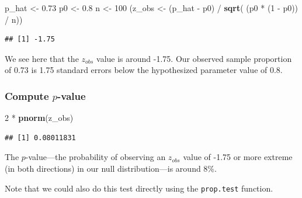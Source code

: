\documentclass[]{tufte-book}
\newenvironment{Shaded}{\begin{snugshade}}{\end{snugshade}}
\newcommand{\KeywordTok}[1]{\textcolor[rgb]{0.13,0.29,0.53}{\textbf{{#1}}}}
\newcommand{\DataTypeTok}[1]{\textcolor[rgb]{0.13,0.29,0.53}{{#1}}}
\newcommand{\DecValTok}[1]{\textcolor[rgb]{0.00,0.00,0.81}{{#1}}}
\newcommand{\FloatTok}[1]{\textcolor[rgb]{0.00,0.00,0.81}{{#1}}}
\newcommand{\StringTok}[1]{\textcolor[rgb]{0.31,0.60,0.02}{{#1}}}
\newcommand{\OtherTok}[1]{\textcolor[rgb]{0.56,0.35,0.01}{{#1}}}
\newcommand{\NormalTok}[1]{{#1}}
\begin{document}
\begin{Shaded}
\begin{Highlighting}[]
\NormalTok{p_hat <-}\StringTok{ }\FloatTok{0.73}
\NormalTok{p0 <-}\StringTok{ }\FloatTok{0.8}
\NormalTok{n <-}\StringTok{ }\DecValTok{100}
\NormalTok{(z_obs <-}\StringTok{ }\NormalTok{(p_hat -}\StringTok{ }\NormalTok{p0) /}\StringTok{ }\KeywordTok{sqrt}\NormalTok{( (p0 *}\StringTok{ }\NormalTok{(}\DecValTok{1} \NormalTok{-}\StringTok{ }\NormalTok{p0)) /}\StringTok{ }\NormalTok{n))}
\end{Highlighting}
\end{Shaded}

\begin{verbatim}
## [1] -1.75
\end{verbatim}

We see here that the \(z_{obs}\) value is around -1.75. Our observed
sample proportion of 0.73 is 1.75 standard errors below the hypothesized
parameter value of 0.8.

\subsubsection{\texorpdfstring{Compute
\(p\)-value}{Compute p-value}}\label{compute-p-value-1}

\begin{Shaded}
\begin{Highlighting}[]
\DecValTok{2} \NormalTok{*}\StringTok{ }\KeywordTok{pnorm}\NormalTok{(z_obs)}
\end{Highlighting}
\end{Shaded}

\begin{verbatim}
## [1] 0.08011831
\end{verbatim}

The \(p\)-value---the probability of observing an \(z_{obs}\) value of
-1.75 or more extreme (in both directions) in our null distribution---is
around 8\%.

Note that we could also do this test directly using the
\texttt{prop.test} function.

\begin{Shaded}
\end{Shaded}
\end{document}
